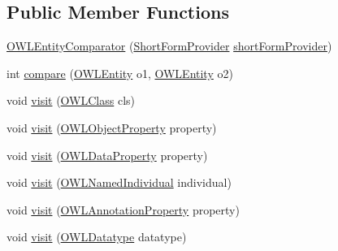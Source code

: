 \subsection*{Public Member Functions}
\begin{DoxyCompactItemize}
\item 
\hyperlink{classorg_1_1semanticweb_1_1owlapi_1_1util_1_1_o_w_l_entity_comparator_a4e9963200a3661c0e293dcd6e9c827c8}{O\-W\-L\-Entity\-Comparator} (\hyperlink{interfaceorg_1_1semanticweb_1_1owlapi_1_1util_1_1_short_form_provider}{Short\-Form\-Provider} \hyperlink{classorg_1_1semanticweb_1_1owlapi_1_1util_1_1_o_w_l_entity_comparator_add68940b53f7201f040c1acec502c179}{short\-Form\-Provider})
\item 
int \hyperlink{classorg_1_1semanticweb_1_1owlapi_1_1util_1_1_o_w_l_entity_comparator_ae5b4ad9d196e77f3950139064bd32853}{compare} (\hyperlink{interfaceorg_1_1semanticweb_1_1owlapi_1_1model_1_1_o_w_l_entity}{O\-W\-L\-Entity} o1, \hyperlink{interfaceorg_1_1semanticweb_1_1owlapi_1_1model_1_1_o_w_l_entity}{O\-W\-L\-Entity} o2)
\item 
void \hyperlink{classorg_1_1semanticweb_1_1owlapi_1_1util_1_1_o_w_l_entity_comparator_aff0c5b54a87b9b25f331b01595aff402}{visit} (\hyperlink{interfaceorg_1_1semanticweb_1_1owlapi_1_1model_1_1_o_w_l_class}{O\-W\-L\-Class} cls)
\item 
void \hyperlink{classorg_1_1semanticweb_1_1owlapi_1_1util_1_1_o_w_l_entity_comparator_a7525c0bf935beb723bf06530ff38a8ff}{visit} (\hyperlink{interfaceorg_1_1semanticweb_1_1owlapi_1_1model_1_1_o_w_l_object_property}{O\-W\-L\-Object\-Property} property)
\item 
void \hyperlink{classorg_1_1semanticweb_1_1owlapi_1_1util_1_1_o_w_l_entity_comparator_a04d018501329e944260a233864f4cc82}{visit} (\hyperlink{interfaceorg_1_1semanticweb_1_1owlapi_1_1model_1_1_o_w_l_data_property}{O\-W\-L\-Data\-Property} property)
\item 
void \hyperlink{classorg_1_1semanticweb_1_1owlapi_1_1util_1_1_o_w_l_entity_comparator_ac9f5844c5d8248105dc0780e4e8b0150}{visit} (\hyperlink{interfaceorg_1_1semanticweb_1_1owlapi_1_1model_1_1_o_w_l_named_individual}{O\-W\-L\-Named\-Individual} individual)
\item 
void \hyperlink{classorg_1_1semanticweb_1_1owlapi_1_1util_1_1_o_w_l_entity_comparator_a7dfef2abb274eaa3f26780ba815259b1}{visit} (\hyperlink{interfaceorg_1_1semanticweb_1_1owlapi_1_1model_1_1_o_w_l_annotation_property}{O\-W\-L\-Annotation\-Property} property)
\item 
void \hyperlink{classorg_1_1semanticweb_1_1owlapi_1_1util_1_1_o_w_l_entity_comparator_afd056c14c00ca575dfbd0fd8994283a6}{visit} (\hyperlink{interfaceorg_1_1semanticweb_1_1owlapi_1_1model_1_1_o_w_l_datatype}{O\-W\-L\-Datatype} datatype)
\end{DoxyCompactItemize}
